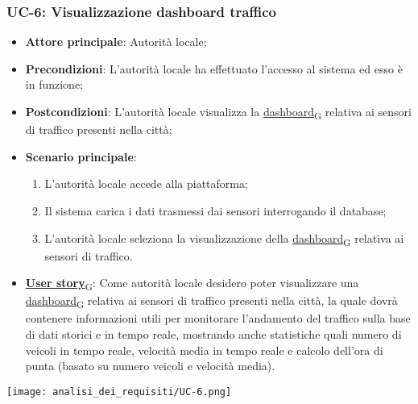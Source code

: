 \subsubsection{UC-6: Visualizzazione dashboard traffico}
\begin{itemize}
	\item \textbf{Attore principale}: Autorità locale;
	\item \textbf{Precondizioni}: L'autorità locale ha effettuato l'accesso al sistema ed esso è in funzione;
	\item \textbf{Postcondizioni}: L'autorità locale visualizza la \href{https://7last.github.io/docs/rtb/documentazione-interna/glossario\#dashboard}{dashboard\textsubscript{G}} relativa
	      ai sensori di traffico presenti nella città;
	\item \textbf{Scenario principale}:
	      \begin{enumerate}
		      \item L'autorità locale accede alla piattaforma;
		      \item Il sistema carica i dati trasmessi dai sensori interrogando il database;
		      \item L'autorità locale seleziona la visualizzazione della \href{https://7last.github.io/docs/rtb/documentazione-interna/glossario\#dashboard}{dashboard\textsubscript{G}} relativa ai sensori di traffico.
	      \end{enumerate}
	\item \href{https://7last.github.io/docs/rtb/documentazione-interna/glossario\#user-story}{\textbf{User story}\textsubscript{G}}:
	      Come autorità locale desidero poter visualizzare una \href{https://7last.github.io/docs/rtb/documentazione-interna/glossario\#dashboard}{dashboard\textsubscript{G}} relativa ai sensori di traffico presenti nella città, la quale
	      dovrà contenere informazioni utili per monitorare l'andamento del traffico sulla base di dati storici e in tempo reale, mostrando
	      anche statistiche quali numero di veicoli in tempo reale, velocità media in tempo reale e calcolo dell'ora di punta (basato su numero veicoli e velocità media).
\end{itemize}
\begin{center}
	\texttt{[image: analisi\_dei\_requisiti/UC-6.png]}
\end{center}


